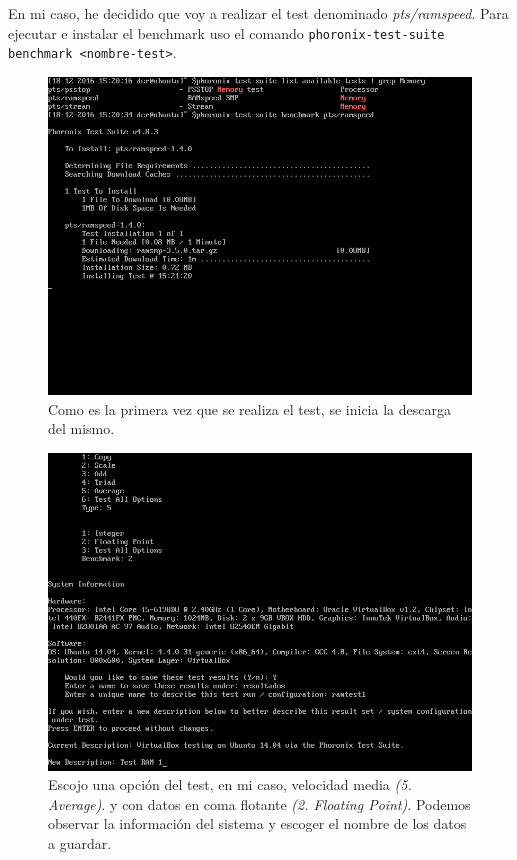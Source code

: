 En mi caso, he decidido que voy a realizar el test denominado \textit{pts/ramspeed}. Para ejecutar e instalar el benchmark uso el comando \verb|phoronix-test-suite benchmark <nombre-test>|. \cite{c1}

\begin{figure}[H]
	\centering
	\includegraphics[scale=0.4]{testDownload.png}
	\caption{Como es la primera vez que se realiza el test, se inicia la descarga del mismo.}
\end{figure}

\begin{figure}[H]
	\centering
	\includegraphics[scale=0.4]{testExec.png}
	\caption{Escojo una opción del test, en mi caso, velocidad media \textit{(5. Average)}. y con datos en coma flotante \textit{(2. Floating Point)}. Podemos observar la información del sistema y escoger el nombre de los datos a guardar.}
\end{figure}

